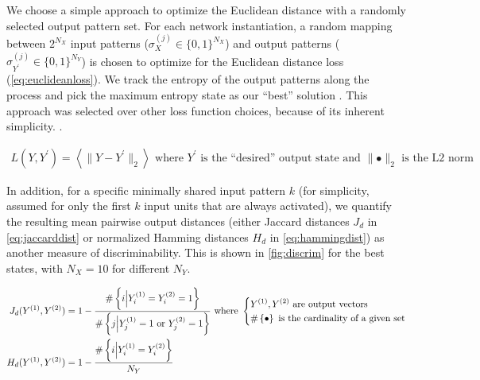 We choose a simple approach to optimize the Euclidean distance with a randomly selected output pattern set.
For each network instantiation,
    a random mapping between $2^{N_X}$ input patterns ($\sigma_X^{(j)} \in \{0,1\}^{N_X}$)
        and output patterns ($\sigma_{Y^\prime}^{(j)} \in \{0,1\}^{N_Y}$)
    is chosen to optimize for the Euclidean distance loss (\autoref{eq:euclideanloss}).
We track the entropy of the output patterns along the process
    and pick the maximum entropy state as our ``best'' solution
    .
    This approach was selected over other loss function choices, because of its inherent simplicity.
    .

\vspace{-1em}
\begin{align}
    L(Y, Y^{\prime}) = \left \langle \lVert Y - Y^{\prime} \rVert_2 \right \rangle
    \text{ where } Y^{\prime} \text{ is the ``desired'' output state}
    \text{ and } \lVert \bullet \rVert_2 \text{ is the L2 norm}
    \label{eq:euclideanloss}
\end{align}

In addition, for a specific minimally shared input pattern $k$
        (for simplicity, assumed for only the first $k$ input units that are always activated),
        we quantify the resulting mean pairwise output distances
        (either Jaccard distances $J_d$ in \autoref{eq:jaccarddist}
        or normalized Hamming distances $H_d$ in \autoref{eq:hammingdist})
        as another measure of discriminability.
    This is shown in \autoref{fig:discrim} for the best states,
        with $N_X=10$ for different $N_Y$.

\vspace{-1em}
\begin{align}
    J_d(Y^{(1)}, Y^{(2)}) &= 1 -
        \frac{
            \# \left\{
                i \Big| Y^{(1)}_i = Y^{(2)}_i = 1
                \right\}
        }{
            \# \left\{
                j \Big| Y^{(1)}_j = 1 \text{ or } Y^{(2)}_j = 1
                \right\}
        }
        \text{ where }
        \begin{dcases}
            Y^{(1)}, Y^{(2)} \text{ are output vectors}
            \\
            \# \left\{\bullet\right\}
            \text{ is the cardinality of a given set}
        \end{dcases}
    \label{eq:jaccarddist}
    \\
    H_d(Y^{(1)}, Y^{(2)}) &= 1 -
        \frac{
            \# \left\{
                i \Big| Y^{(1)}_i = Y^{(2)}_i
                \right\}
        }{
            N_Y
        }
    \label{eq:hammingdist}
\end{align}


